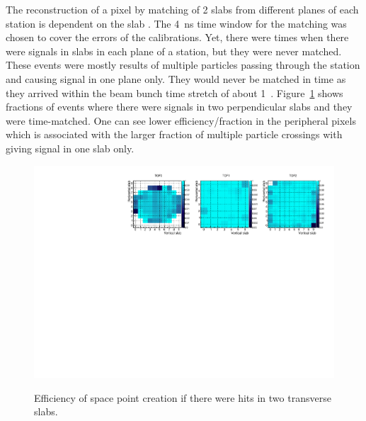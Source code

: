 
The reconstruction of a pixel by matching of 2 slabs from different
planes of each station is dependent on the slab \DT{}. The 4~ns time
window for the matching was chosen to cover the errors of the
calibrations. Yet, there were times when there were signals in slabs
in each plane of a station, but they were never matched. These events
were mostly results of multiple particles passing through the station
and causing signal in one plane only. They would never be matched in
time as they arrived within the beam bunch time stretch of about
1~\us{}. Figure~\ref{fig:SpEffByPixel} shows fractions of events where
there were signals in two perpendicular slabs and they were
time-matched. One can see lower efficiency/fraction in the peripheral
pixels which is associated with the larger fraction of multiple
particle crossings with giving signal in one slab only.



\begin{figure}[!htb]
  \begin{center}
  \includegraphics[width=15cm]{08_sp_eff_by_pixel_2d} \\
  \caption{Efficiency of space point creation if there were hits in
    two transverse slabs.}
  \label{fig:SpEffByPixel}
  \end{center}
\end{figure}

